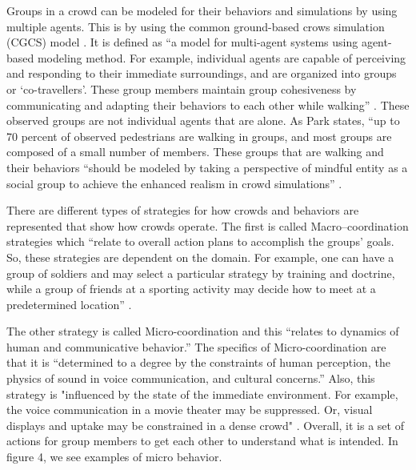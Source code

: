 \documentclass[tog]{acmsiggraph}
\begin{document}
	Groups in a crowd can be modeled for their behaviors and simulations by using multiple agents. This is by using the common ground-based crows simulation (CGCS) model \cite{park2013simulating}. It is defined as ``a model for multi-agent systems using agent-based modeling method. For example, individual agents are capable of perceiving and responding to their immediate surroundings, and are organized into groups or ‘co-travellers’. These group members maintain group cohesiveness by communicating and adapting their behaviors to each other while walking'' \cite{park2013modeling}.
These observed groups are not individual agents that are alone. As Park states, ``up to 70 percent of observed pedestrians are walking in groups, and most groups are composed of a small number of members. These groups that are walking and their behaviors ``should be modeled by taking a perspective of mindful entity as a social group to achieve the enhanced realism in crowd simulations'' \cite{park2013modeling}. 

There are different types of strategies for how crowds and behaviors are represented that show how crowds operate. The first is called Macro–coordination strategies which ``relate to overall action plans to accomplish the groups' goals. So, these strategies are dependent on the domain. For example, one can have a group of soldiers and may select a particular strategy by training and doctrine, while a group of friends at a sporting activity may decide how to meet at a predetermined location'' \cite{park2013modeling}. 

The other strategy is called Micro-coordination and this ``relates to dynamics of human and communicative behavior.'' The specifics of Micro-coordination are that it is ``determined to a degree by the constraints of human perception, the physics of sound in voice communication, and cultural concerns.'' Also, this strategy is "influenced by the state of the immediate environment. For example, the voice communication in a movie theater may be suppressed. Or, visual displays and uptake may be constrained in a dense crowd" \cite{park2013modeling}. Overall, it is a set of actions for group members to get each other to understand what is intended. In figure 4, we see examples of micro behavior.
\end{document}
